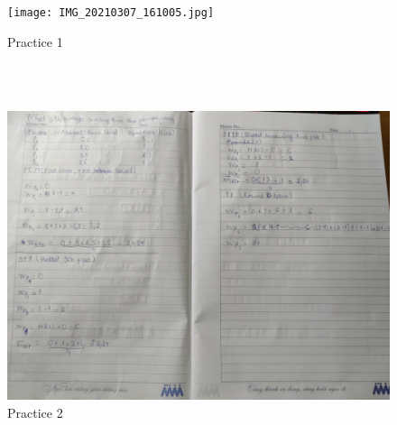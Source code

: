 \documentclass{article}
\begin{document}
\begin{figure}
\begin{tcolorbox}
\texttt{[image: IMG\_20210307\_161005.jpg]}
\caption{Practice 1}
\end{tcolorbox}
\\
\\
\begin{tcolorbox}
\includegraphics[scale=0.5, width=\linewidth]{IMG_20210307_160949.jpg}
\caption{Practice 2}
\end{tcolorbox}
\end{figure}
\end{document}
